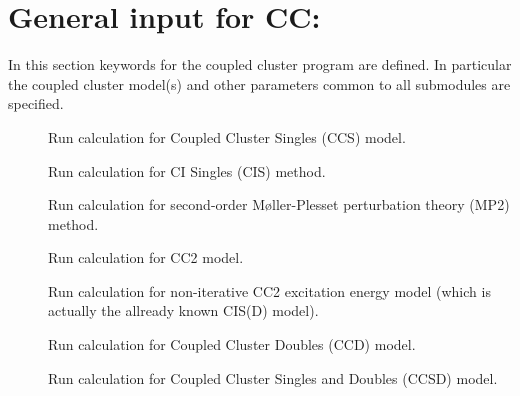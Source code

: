 \section{General input for CC: }\label{sec:ccgeneral}

In this section keywords for the coupled
cluster program are defined. In particular the coupled cluster 
model(s) and other parameters common to all submodules are specified.

\begin{description}
\item[] 
        Run calculation for Coupled Cluster Singles
        (CCS) model. 
         
%
%
%
\item[]    
        Run calculation for CI Singles (CIS) method. 
%
\item[]    
        Run calculation for second-order M{\o}ller-Plesset 
        perturbation theory (MP2) method.  
%
\item[]    
        Run calculation for CC2 model. 
 
\item[]  
        Run calculation for non-iterative CC2 excitation energy model 
        (which is actually the allready known CIS(D) model).
 
\item[]    
        Run calculation for Coupled Cluster Doubles
        (CCD) model. 
%
\item[]   
        Run calculation for Coupled Cluster Singles and Doubles
        (CCSD) model. 
%
%


\end{description}
